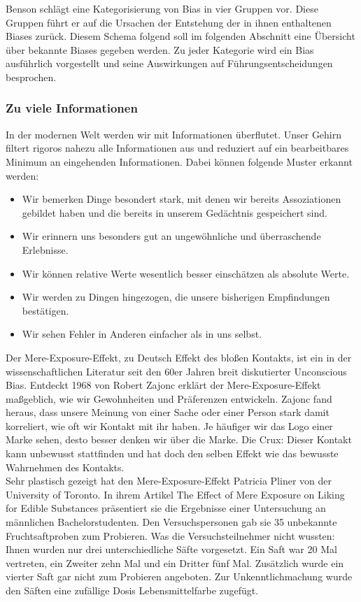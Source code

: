 Benson schlägt eine Kategorisierung von Bias in vier Gruppen vor. Diese Gruppen führt er auf die Ursachen der Entstehung der in ihnen enthaltenen Biases zurück. Diesem Schema folgend soll im folgenden Abschnitt eine Übersicht über bekannte Biases gegeben werden. Zu jeder Kategorie wird ein Bias ausführlich vorgestellt und seine Auswirkungen auf Führungsentscheidungen besprochen.

\subsubsection{Zu viele Informationen}
In der modernen Welt werden wir mit Informationen überflutet. Unser Gehirn filtert rigoros nahezu alle Informationen aus und reduziert auf ein bearbeitbares Minimum an eingehenden Informationen. Dabei können folgende Muster erkannt werden:
\begin{itemize}
	\item Wir bemerken Dinge besondert stark, mit denen wir bereits Assoziationen gebildet haben und die bereits in unserem Gedächtnis gespeichert sind.\cite{HAS77}
	\item Wir erinnern uns besonders gut an ungewöhnliche und überraschende Erlebnisse.\cite{BAU01}
	\item Wir können relative Werte wesentlich besser einschätzen als absolute Werte. \cite{KAH06}
	\item Wir werden zu Dingen hingezogen, die unsere bisherigen Empfindungen bestätigen.\cite{PLO93}
	\item Wir sehen Fehler in Anderen einfacher als in uns selbst.\cite{PRO02}
\end{itemize}

Der \glqq Mere-Exposure-Effekt\grqq, zu Deutsch \glqq Effekt des bloßen Kontakts\grqq, ist ein in der wissenschaftlichen Literatur seit den 60er Jahren breit diskutierter Unconscious Bias. Entdeckt 1968 von Robert Zajonc\cite{ZAJ68} erklärt der Mere-Exposure-Effekt maßgeblich, wie wir Gewohnheiten und Präferenzen entwickeln. Zajonc fand heraus, dass unsere Meinung von einer Sache oder einer Person stark damit korreliert, wie oft wir Kontakt mit ihr haben. Je häufiger wir das Logo einer Marke sehen, desto besser denken wir über die Marke. Die Crux: Dieser Kontakt kann unbewusst stattfinden und hat doch den selben Effekt wie das bewusste Wahrnehmen des Kontakts. \\

Sehr plastisch gezeigt hat den Mere-Exposure-Effekt Patricia Pliner von der University of Toronto. In ihrem Artikel \glqq The Effect of Mere Exposure on Liking for Edible Substances\grqq\cite{PLI82} präsentiert sie die Ergebnisse einer Untersuchung an männlichen Bachelorstudenten. Den Versuchspersonen gab sie 35 unbekannte Fruchtsaftproben zum Probieren. Was die Versuchsteilnehmer nicht wussten: Ihnen wurden nur drei unterschiedliche Säfte vorgesetzt. Ein Saft war 20 Mal vertreten, ein Zweiter zehn Mal und ein Dritter fünf Mal. Zusätzlich wurde ein vierter Saft gar nicht zum Probieren angeboten. Zur Unkenntlichmachung wurde den Säften eine zufällige Dosis Lebensmittelfarbe zugefügt. \\


